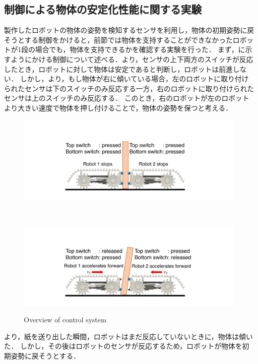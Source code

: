 \subsection{制御による物体の安定化性能に関する実験}
製作したロボットの物体の姿勢を検知するセンサを利用し，物体の初期姿勢に戻そうとする制御をかけると，前節では物体を支持することができなかったロボットが1段の場合でも，物体を支持できるかを確認する実験を行った．
まず，に示すようにかける制御について述べる．より，センサの上下両方のスイッチが反応したとき，ロボットに対して物体は安定であると判断し，ロボットは前進しない．
しかし，より，もし物体が右に傾いている場合，左のロボットに取り付けられたセンサは下のスイッチのみ反応する一方，右のロボットに取り付けられたセンサは上のスイッチのみ反応する．
このとき，右のロボットが左のロボットより大きい速度で物体を押し付けることで，物体の姿勢を保つと考える．
\begin{figure}[tb]
  \begin{minipage}{\hsize}
  \centering
  \includegraphics[width=0.65\columnwidth]{figures/control-upright-v3.pdf}
  \label{fig:upright}
 \end{minipage}\\
 \begin{minipage}{\hsize}
  \centering
  \includegraphics[width=0.65\columnwidth]{figures/control-tilted-v3.pdf}
  \label{fig:tilted}
 \end{minipage}
 \caption{Overview of control system}
 \label{fig:control-figure}
\end{figure}
より，紙を送り出した瞬間，ロボットはまだ反応していないときに，物体は傾いた．
しかし，その後はロボットのセンサが反応するため，ロボットが物体を初期姿勢に戻そうとする．
